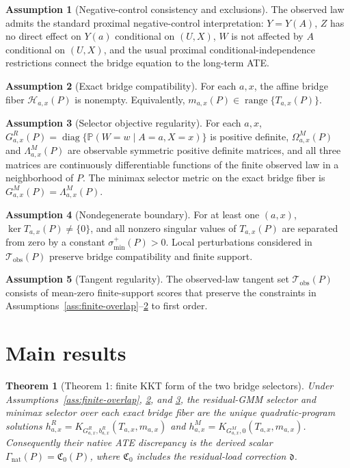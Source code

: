 \documentclass[11pt]{article}
\renewcommand{\Pr}{\mathbb{P}}
\newcommand{\calH}{\mathcal{H}}
\theoremstyle{definition}
\newtheorem{assumption}{Assumption}
\theoremstyle{plain}
\newtheorem{theorem}{Theorem}
\theoremstyle{remark}
\begin{document}
\begin{assumption}[Negative-control consistency and exclusions]\label{ass:negative-control}
The observed law admits the standard proximal negative-control interpretation: \(Y=Y(A)\), \(Z\) has no direct effect on \(Y(a)\) conditional on \((U,X)\), \(W\) is not affected by \(A\) conditional on \((U,X)\), and the usual proximal conditional-independence restrictions connect the bridge equation to the long-term ATE.
\end{assumption}

\begin{assumption}[Exact bridge compatibility]\label{ass:bridge-compatible}
For each \(a,x\), the affine bridge fiber \(\calH_{a,x}(P)\) is nonempty. Equivalently, \(m_{a,x}(P)\in\operatorname{range}\{T_{a,x}(P)\}\).
\end{assumption}

\begin{assumption}[Selector objective regularity]\label{ass:selector-metrics}
For each \(a,x\), \(G^R_{a,x}(P)=\operatorname{diag}\{\Pr(W=w\mid A=a,X=x)\}\) is positive definite, \(\Omega^M_{a,x}(P)\) and \(\Lambda^M_{a,x}(P)\) are observable symmetric positive definite matrices, and all three matrices are continuously differentiable functions of the finite observed law in a neighborhood of \(P\). The minimax selector metric on the exact bridge fiber is \(G^M_{a,x}(P)=\Lambda^M_{a,x}(P)\).
\end{assumption}

\begin{assumption}[Nondegenerate boundary]\label{ass:boundary}
For at least one \((a,x)\), \(\ker T_{a,x}(P)\neq\{0\}\), and all nonzero singular values of \(T_{a,x}(P)\) are separated from zero by a constant \(\sigma_{\min}^+(P)>0\). Local perturbations considered in \(\mathcal{T}_{\mathrm{obs}}(P)\) preserve bridge compatibility and finite support.
\end{assumption}

\begin{assumption}[Tangent regularity]\label{ass:tangent}
The observed-law tangent set \(\mathcal{T}_{\mathrm{obs}}(P)\) consists of mean-zero finite-support scores that preserve the constraints in Assumptions~\ref{ass:finite-overlap}--\ref{ass:bridge-compatible} to first order.
\end{assumption}

\section{Main results}
\begin{theorem}[Theorem 1: finite KKT form of the two bridge selectors]\label{thm:kkt}
Under Assumptions~\ref{ass:finite-overlap}, \ref{ass:bridge-compatible}, and \ref{ass:selector-metrics}, the residual-GMM selector and minimax selector over each exact bridge fiber are the unique quadratic-program solutions \(h^R_{a,x}=K_{G^R_{a,x},b^R_{a,x}}(T_{a,x},m_{a,x})\) and \(h^M_{a,x}=K_{G^M_{a,x},0}(T_{a,x},m_{a,x})\). Consequently their native ATE discrepancy is the derived scalar \(\Gamma_{\mathrm{nat}}(P)=\mathfrak C_0(P)\), where \(\mathfrak C_0\) includes the residual-load correction \(\mathfrak d\).
\end{theorem}
\end{document}
